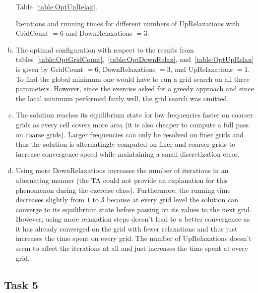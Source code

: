 \documentclass[11pt]{article}
\begin{document}
\begin{enumerate}[a)]
        Table~\ref{table:OptUpRelax}.
        \begin{table}[H]
            \caption{Iterations and running times for different numbers of
            UpRelaxations with GridCount $= 6$ and DownRelaxations $= 3$.}
            \begin{center}
                
            \end{center}
            \label{table:OptUpRelax}
        \end{table}
        \item The optimal configuration with respect to the results from
        tables~\ref{table:OptGridCount},~\ref{table:OptDownRelax},
        and~\ref{table:OptUpRelax} is given by GridCount $= 6$,
        DownRelaxations $= 3$, and UpRelaxations $= 1$.
        To find the global minimum one would have to run a grid search on all
        three parameters.
        However, since the exercise asked for a greedy approach and since
        the local minimum performed fairly well, the grid search was omitted.
        \item The solution reaches its equilibrium state for low frequencies
        faster on coarser grids as every cell covers more area (it is also
        cheaper to compute a full pass on coarse grids).
        Larger frequencies can only be resolved on finer grids and thus
        the solution is alternatingly computed on finer and coarser grids to
        increase convergence speed while maintaining a small discretization
        error.
        \item Using more DownRelaxations increases the number of iterations
        in an alternating manner (the TA could not provide an explanation
        for this phenomenon during the exercise class).
        Furthermore, the running time decreases slightly from $1$ to $3$
        because at every grid level the solution can converge to its
        equilibrium state before passing on its values to the next grid.
        However, using more relaxation steps doesn't lead to a better
        convergence as it has already converged on the grid with fewer
        relaxations and thus just increases the time spent on every grid.
        The number of UpRelaxations doesn't seem to affect the iterations at
        all and just increases the time spent at every grid.
    \end{enumerate}

    \subsection*{Task 5}
    \label{subsec:Task5}
\end{document}
